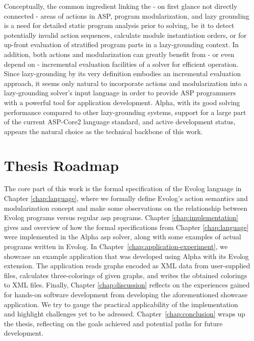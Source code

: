 Conceptually, the common ingredient linking the - on first glance not directly connected - areas of actions in ASP, program modularization, and lazy grounding is a need for detailed static program analysis prior to solving, be it to detect potentially invalid action sequences, calculate module instantiation orders, or for up-front evaluation of stratified program parts in a lazy-grounding context. In addition, both actions and modularization can greatly benefit from - or even depend on - incremental evaluation facilities of a solver for efficient operation. Since lazy-grounding by its very definition embodies an incremental evaluation approach, it seems only natural to incorporate actions and modularization into a lazy-grounding solver's input language in order to provide ASP programmers with a powerful tool for application development. Alpha, with its good solving performance compared to other lazy-grounding systems, support for a large part of the current ASP-Core2 language standard, and active development status, appears the natural choice as the technical backbone of this work.

\section{Thesis Roadmap}
\label{sec:thesis-roadmap}

The core part of this work is the formal specification of the Evolog language in Chapter \ref{chap:language}, where we formally define Evolog's action semantics and modularization concept and make some observations on the relationship between Evolog programs versus regular \gls{asp} programs. Chapter \ref{chap:implementation} gives and overview of how the formal specifications from Chapter \ref{chap:language} were implemented in the Alpha \gls{asp} solver, along with some examples of actual programs written in Evolog. In Chapter~\ref{chap:application-experiment}, we showcase an example application that was developed using Alpha with its Evolog extension. The application reads graphs encoded as XML data from user-supplied files, calculates three-colorings of given graphs, and writes the obtained colorings to XML files. Finally, Chapter \ref{chap:discussion} reflects on the experiences gained for hands-on software development from developing the aforementioned showcase application. We try to gauge the practical applicability of the implementation and highlight challenges yet to be adressed. Chapter~\ref{chap:conclusion} wraps up the thesis, reflecting on the goals achieved and potential paths for future development.